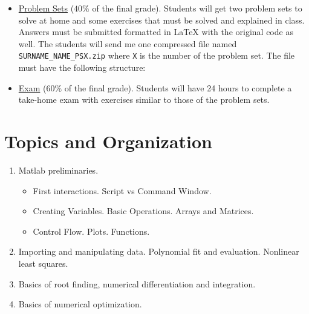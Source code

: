 \documentclass[a4paper,12pt]{article}
\begin{document}
\begin{itemize}
    \item \underline{Problem Sets} ($40\%$ of the final grade).
    Students will get two problem sets to solve at home and some exercises that must be solved and explained in class. Answers must be submitted formatted in { \LaTeX } with the original code as well. The students will send me one compressed file named \verb+SURNAME_NAME_PSX.zip+ where \verb+X+ is the number of the problem set. The file must have the following structure:
    
    \begin{minipage}[c]{0.8\textwidth}
    \end{minipage}
    \item \underline{Exam} ($60\%$ of the final grade). Students will have 24 hours to complete a take-home exam with exercises similar to those of the problem sets.
\end{itemize}

\section{Topics and Organization}

\begin{enumerate}[label={\textbf{Session \arabic*}}]
    \item Matlab preliminaries. 
    \begin{itemize}
        \item First interactions. Script vs Command Window.
        \item Creating Variables. Basic Operations. Arrays and Matrices.
        \item Control Flow. Plots. Functions.
    \end{itemize}
    \item Importing and manipulating data. Polynomial fit and evaluation. Nonlinear least squares.
    \item Basics of root finding, numerical differentiation and integration.
    \item Basics of numerical optimization.
\end{enumerate}
\end{document}
